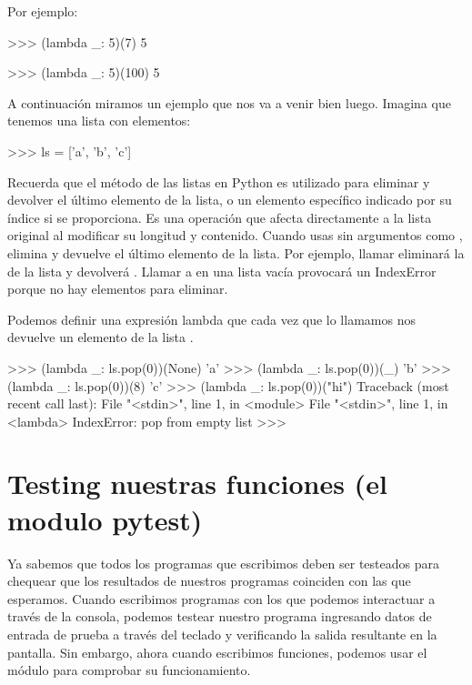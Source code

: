 Por ejemplo:

\begin{python}
>>> (lambda _: 5)(7)
5

>>> (lambda _: 5)(100)
5
\end{python}


A continuación miramos un ejemplo que nos va a venir bien luego. Imagina que tenemos una lista con elementos:

\begin{python}
>>> ls = ['a', 'b', 'c']
\end{python}

Recuerda que el método  de las listas en Python es utilizado para eliminar y devolver el último elemento de la lista, o un elemento específico indicado por su índice si se proporciona. Es una operación que afecta directamente a la lista original al modificar su longitud y contenido. Cuando usas  sin argumentos como , elimina y devuelve el último elemento de la lista. Por ejemplo, llamar  eliminará la  de la lista y devolverá . Llamar a  en una lista vacía provocará un IndexError porque no hay elementos para eliminar.

Podemos definir una expresión lambda  que cada vez que lo llamamos nos devuelve un elemento de la lista .

\begin{python}
>>> (lambda _: ls.pop(0))(None)
'a'
>>> (lambda _: ls.pop(0))(_)
'b'
>>> (lambda _: ls.pop(0))(8)
'c'
>>> (lambda _: ls.pop(0))("hi")
Traceback (most recent call last):
  File "<stdin>", line 1, in <module>
  File "<stdin>", line 1, in <lambda>
IndexError: pop from empty list
>>> 
\end{python}


\section{Testing nuestras funciones (el modulo pytest)}
 
Ya sabemos que todos los programas que escribimos deben ser testeados para chequear que los resultados de nuestros programas coinciden con las que esperamos. 
%
Cuando escribimos programas con los que podemos interactuar a través de la consola, podemos testear nuestro programa ingresando datos de entrada de prueba a través del teclado y verificando la salida resultante en la pantalla.
%
Sin embargo, ahora cuando escribimos funciones, podemos usar el módulo  para comprobar su funcionamiento.

